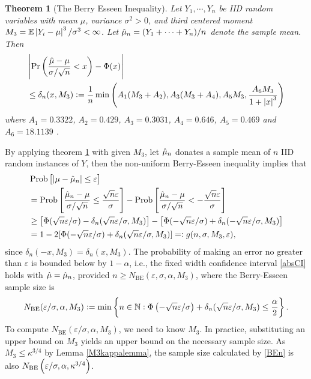 \documentclass{iitthesis}
\newtheorem{theorem}{Theorem}[section]
\begin{document}
\begin{theorem}[The Berry Esseen Inequality] \label{BEThm}
Let $Y_1,\cdots,Y_n$ be IID random variables with mean $\mu$, variance $\sigma^2 >0$, and third centered moment $M_3 = \mathbb{E}\left \lvert Y_i-\mu \right \rvert^3/\sigma^3 < \infty$. Let $\hat{\mu}_n = (Y_1+\cdots+Y_n)/n$ denote the sample mean. Then
\begin{align}
&\left \lvert \Pr\left(\frac{\hat{\mu}-\mu}{\sigma/\sqrt{n}}<x\right)-\Phi(x) \right \rvert\\
& \leq \delta_n(x,M_3):=\frac{1}{n}\min\left( A_1(M_3+A_2),  A_3(M_3+A_4), A_5M_3, \frac{A_6M_3}{1+\left \lvert x \right \rvert^3}\right)
\end{align}
where $A_1 = 0.3322$, $A_2 = 0.429$, $A_3=0.3031$, $A_4=0.646$, $A_5=0.469$ \cite{She13} and $A_6=18.1139$ \cite{NeShe12}.
\end{theorem}
By applying theorem \ref{BEThm} with given $M_3$, let $\hat{\mu}_n$ donates a sample mean of $n$ IID random instances of $Y$, then the non-uniform Berry-Esseen inequality implies that
\begin{align} 
&\operatorname{Prob}\left[\left \lvert \mu-\hat{\mu}_n \right \rvert  \le \varepsilon \right]\nonumber\\
&=\operatorname{Prob}\left[\frac{\hat{\mu}_n - \mu}{\sigma/\sqrt{n}} \le \frac{\sqrt{n}\varepsilon}{\sigma} \right]-\operatorname{Prob}\left[\frac{\hat{\mu}_n - \mu}{\sigma/\sqrt{n}} < -\frac{\sqrt{n}\varepsilon}{\sigma}\right] \nonumber \\ 
&\ge \left[\Phi(\sqrt{n}\varepsilon/\sigma)-\delta_n(\sqrt{n}\varepsilon/\sigma,M_3)\right] -\left[\Phi(-\sqrt{n}\varepsilon/\sigma) + \delta_n(-\sqrt{n}\varepsilon/\sigma,M_3)\right] \nonumber \\
&=1-2[\Phi(-\sqrt{n}\varepsilon/\sigma) + \delta_n(\sqrt{n}\varepsilon/\sigma,M_3)] =: g(n, \sigma, M_3, \varepsilon), \label{BEresult}
\end{align}
since $\delta_n(-x,M_3)=\delta_n(x,M_3)$.  The probability of
making an error no greater than $\varepsilon$ is bounded below by $1-\alpha$, i.e., the fixed width confidence interval \eqref{absCI} holds with $\hat{\mu}=\hat{\mu}_n$, provided $n \ge N_{\text{BE}}(\varepsilon,\sigma,\alpha,M_3)$, where the Berry-Esseen sample size is
\begin{equation}\label{BEn}
N_{\text{BE}}(\varepsilon/\sigma,\alpha,M_3) := \min  \left \{ n \in \mathbb{N} : \Phi\left(-\sqrt{n}\varepsilon/\sigma  \right)+\delta_n(\sqrt{n}\varepsilon/\sigma,M_3)
\le \frac{\alpha}{2} \right \}.
\end{equation}
To compute $N_{\text{BE}}(\varepsilon/\sigma,\alpha,M_3)$, we need to know
$M_3$. In practice, substituting an upper bound on $M_3$ yields an upper bound on the necessary sample size.
As $M_3 \leq \kappa^{3/4}$ by Lemma \ref{M3kappalemma}, the sample size calculated by \eqref{BEn} is also $N_{\text{BE}}\left(\varepsilon/\sigma,\alpha,\kappa^{3/4}\right) $.
\end{document}
